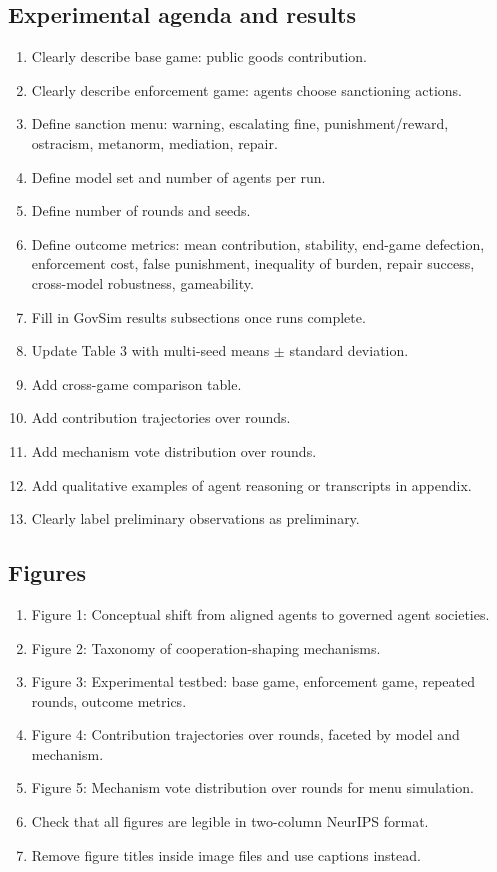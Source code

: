 \subsection*{Experimental agenda and results}
\begin{enumerate}
  \item[$\square$] Clearly describe base game: public goods contribution.
  \item[$\square$] Clearly describe enforcement game: agents choose sanctioning actions.
  \item[$\square$] Define sanction menu: warning, escalating fine, punishment/reward, ostracism, metanorm, mediation, repair.
  \item[$\square$] Define model set and number of agents per run.
  \item[$\square$] Define number of rounds and seeds.
  \item[$\square$] Define outcome metrics: mean contribution, stability, end-game defection, enforcement cost, false punishment, inequality of burden, repair success, cross-model robustness, gameability.
  \item[$\square$] Fill in GovSim results subsections once runs complete.
  \item[$\square$] Update Table 3 with multi-seed means $\pm$ standard deviation.
  \item[$\square$] Add cross-game comparison table.
  \item[$\square$] Add contribution trajectories over rounds.
  \item[$\square$] Add mechanism vote distribution over rounds.
  \item[$\square$] Add qualitative examples of agent reasoning or transcripts in appendix.
  \item[$\square$] Clearly label preliminary observations as preliminary.
\end{enumerate}

\subsection*{Figures}
\begin{enumerate}
  \item[$\square$] Figure 1: Conceptual shift from aligned agents to governed agent societies.
  \item[$\square$] Figure 2: Taxonomy of cooperation-shaping mechanisms.
  \item[$\square$] Figure 3: Experimental testbed: base game, enforcement game, repeated rounds, outcome metrics.
  \item[$\square$] Figure 4: Contribution trajectories over rounds, faceted by model and mechanism.
  \item[$\square$] Figure 5: Mechanism vote distribution over rounds for menu simulation.
  \item[$\square$] Check that all figures are legible in two-column NeurIPS format.
  \item[$\square$] Remove figure titles inside image files and use captions instead.
\end{enumerate}

